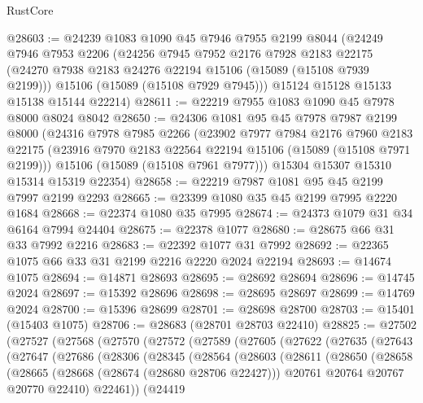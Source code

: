 \begin{lexlean}{RustCore}
\begin{coremodule}
@28603 := @24239
    @1083
    @1090
    @45
    @7946
    @7955
    @2199
    @8044
    (@24249
      @7946
      @7953
      @2206
      (@24256
        @7945
        @7952
        @2176
        @7928
        @2183
        @22175
        (@24270 @7938 @2183 @24276 @22194 @15106 (@15089 (@15108 @7939 @2199)))
        @15106
        (@15089 (@15108 @7929 @7945)))
      @15124
      @15128
      @15133
      @15138
      @15144
      @22214)
@28611 := @22219 @7955 @1083 @1090 @45 @7978 @8000 @8024 @8042
@28650 := @24306
    @1081
    @95
    @45
    @7978
    @7987
    @2199
    @8000
    (@24316
      @7978
      @7985
      @2266
      (@23902
        @7977
        @7984
        @2176
        @7960
        @2183
        @22175
        (@23916 @7970 @2183 @22564 @22194 @15106 (@15089 (@15108 @7971 @2199)))
        @15106
        (@15089 (@15108 @7961 @7977)))
      @15304
      @15307
      @15310
      @15314
      @15319
      @22354)
@28658 := @22219 @7987 @1081 @95 @45 @2199 @7997 @2199 @2293
@28665 := @23399 @1080 @35 @45 @2199 @7995 @2220 @1684
@28668 := @22374 @1080 @35 @7995
@28674 := @24373 @1079 @31 @34 @6164 @7994 @24404
@28675 := @22378 @1077
@28680 := @28675 @66 @31 @33 @7992 @2216
@28683 := @22392 @1077 @31 @7992
@28692 := @22365 @1075 @66 @33 @31 @2199 @2216 @2220 @2024 @22194
@28693 := @14674 @1075
@28694 := @14871 @28693
@28695 := @28692 @28694
@28696 := @14745 @2024
@28697 := @15392 @28696
@28698 := @28695 @28697
@28699 := @14769 @2024
@28700 := @15396 @28699
@28701 := @28698 @28700
@28703 := @15401 (@15403 @1075)
@28706 := @28683 (@28701 @28703 @22410)
@28825 := @27502
    (@27527
      (@27568
        (@27570
          (@27572
            (@27589
              (@27605
                (@27622
                  (@27635
                    (@27643
                      (@27647
                        (@27686
                          (@28306
                            (@28345
                              (@28564
                                (@28603
                                  (@28611
                                    (@28650
                                      (@28658
                                        (@28665
                                          (@28668 (@28674 (@28680 @28706 @22427)))
                                          @20761
                                          @20764
                                          @20767
                                          @20770
                                          @22410)
                                        @22461))
                                    (@24419

\end{coremodule}
\end{lexlean}
